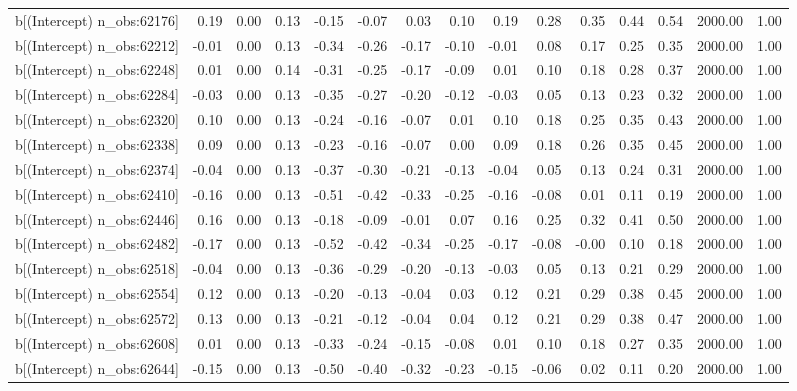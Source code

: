 \begin{table}[ht]
\begin{tabular}{rrrrrrrrrrrrrrr}
  b[(Intercept) n\_obs:62176] & 0.19 & 0.00 & 0.13 & -0.15 & -0.07 & 0.03 & 0.10 & 0.19 & 0.28 & 0.35 & 0.44 & 0.54 & 2000.00 & 1.00 \\ 
  b[(Intercept) n\_obs:62212] & -0.01 & 0.00 & 0.13 & -0.34 & -0.26 & -0.17 & -0.10 & -0.01 & 0.08 & 0.17 & 0.25 & 0.35 & 2000.00 & 1.00 \\ 
  b[(Intercept) n\_obs:62248] & 0.01 & 0.00 & 0.14 & -0.31 & -0.25 & -0.17 & -0.09 & 0.01 & 0.10 & 0.18 & 0.28 & 0.37 & 2000.00 & 1.00 \\ 
  b[(Intercept) n\_obs:62284] & -0.03 & 0.00 & 0.13 & -0.35 & -0.27 & -0.20 & -0.12 & -0.03 & 0.05 & 0.13 & 0.23 & 0.32 & 2000.00 & 1.00 \\ 
  b[(Intercept) n\_obs:62320] & 0.10 & 0.00 & 0.13 & -0.24 & -0.16 & -0.07 & 0.01 & 0.10 & 0.18 & 0.25 & 0.35 & 0.43 & 2000.00 & 1.00 \\ 
  b[(Intercept) n\_obs:62338] & 0.09 & 0.00 & 0.13 & -0.23 & -0.16 & -0.07 & 0.00 & 0.09 & 0.18 & 0.26 & 0.35 & 0.45 & 2000.00 & 1.00 \\ 
  b[(Intercept) n\_obs:62374] & -0.04 & 0.00 & 0.13 & -0.37 & -0.30 & -0.21 & -0.13 & -0.04 & 0.05 & 0.13 & 0.24 & 0.31 & 2000.00 & 1.00 \\ 
  b[(Intercept) n\_obs:62410] & -0.16 & 0.00 & 0.13 & -0.51 & -0.42 & -0.33 & -0.25 & -0.16 & -0.08 & 0.01 & 0.11 & 0.19 & 2000.00 & 1.00 \\ 
  b[(Intercept) n\_obs:62446] & 0.16 & 0.00 & 0.13 & -0.18 & -0.09 & -0.01 & 0.07 & 0.16 & 0.25 & 0.32 & 0.41 & 0.50 & 2000.00 & 1.00 \\ 
  b[(Intercept) n\_obs:62482] & -0.17 & 0.00 & 0.13 & -0.52 & -0.42 & -0.34 & -0.25 & -0.17 & -0.08 & -0.00 & 0.10 & 0.18 & 2000.00 & 1.00 \\ 
  b[(Intercept) n\_obs:62518] & -0.04 & 0.00 & 0.13 & -0.36 & -0.29 & -0.20 & -0.13 & -0.03 & 0.05 & 0.13 & 0.21 & 0.29 & 2000.00 & 1.00 \\ 
  b[(Intercept) n\_obs:62554] & 0.12 & 0.00 & 0.13 & -0.20 & -0.13 & -0.04 & 0.03 & 0.12 & 0.21 & 0.29 & 0.38 & 0.45 & 2000.00 & 1.00 \\ 
  b[(Intercept) n\_obs:62572] & 0.13 & 0.00 & 0.13 & -0.21 & -0.12 & -0.04 & 0.04 & 0.12 & 0.21 & 0.29 & 0.38 & 0.47 & 2000.00 & 1.00 \\ 
  b[(Intercept) n\_obs:62608] & 0.01 & 0.00 & 0.13 & -0.33 & -0.24 & -0.15 & -0.08 & 0.01 & 0.10 & 0.18 & 0.27 & 0.35 & 2000.00 & 1.00 \\ 
  b[(Intercept) n\_obs:62644] & -0.15 & 0.00 & 0.13 & -0.50 & -0.40 & -0.32 & -0.23 & -0.15 & -0.06 & 0.02 & 0.11 & 0.20 & 2000.00 & 1.00 \\ 

\end{tabular}
\end{table}
